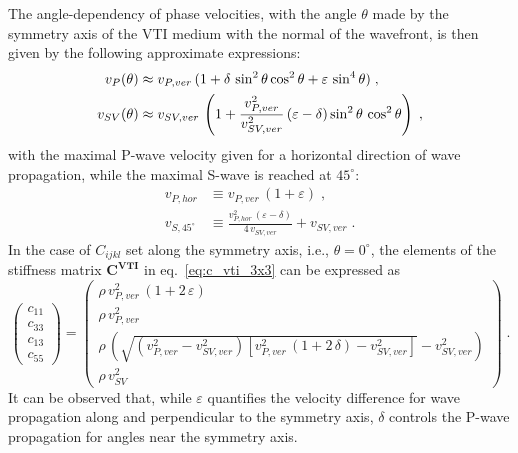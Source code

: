 The angle-dependency of phase velocities, with the angle $\theta$ made by the symmetry axis of the VTI medium with the normal of the wavefront, is then given by the following approximate expressions:
\begin{subequations}
\allowdisplaybreaks
\begin{align}
    v_P(\theta) &\approx v_{P,ver}\,(1+\delta\,\sin^2\theta\cos^2\theta+\varepsilon\,\sin^4\theta)\;,\\
    v_{SV}(\theta) &\approx v_{SV,ver}\,\left(1+\frac{v_{P,ver}^2}{v_{SV,ver}^2}\,(\varepsilon-\delta)\sin^2\theta\,\cos^2\theta\right)\;,
    \label{eq:vel_angle}
\end{align}
\end{subequations}
with the maximal P-wave velocity given for a horizontal direction of wave propagation, while the maximal S-wave is reached at $45^{\circ}$:
\begin{subequations}
    \begin{align}
    v_{P,hor} &\equiv v_{P,ver}\,(1+\varepsilon)\;,\\
    v_{S,45^{\circ}} &\equiv \frac{v_{P,hor}^2\,(\varepsilon-\delta)}{4\,v_{SV,ver}}+v_{SV,ver}\;.
    \end{align}
    \label{eq:v_aniso}
\end{subequations}%
In the case of $C_{ijkl}$ set along the symmetry axis, i.e., $\theta=0^{\circ}$, the elements of the stiffness matrix $\mathbf{C}^\mathbf{VTI}$ in eq.~\ref{eq:c_vti_3x3} can be expressed as
\begin{equation}
    \renewcommand{\arraystretch}{2}
    \begin{pmatrix}
    c_{11} \\
    c_{33} \\
    c_{13} \\
    c_{55}
    \end{pmatrix} = 
    \begin{pmatrix}
    \rho\,v_{P,ver}^2\,(1+2\,\varepsilon) \\
    \rho\,v_{P,ver}^2 \\
    \rho\,\left(\sqrt{\left(v_{P,ver}^2-v_{SV,ver}^2\right)\left[v_{P,ver}^2\,\left(1+2\,\delta\right)-v_{SV,ver}^2\right]}-v_{SV,ver}^2\right) \\
    \rho\,v_{SV}^2 
    \end{pmatrix}\;.
    \label{eq:c_vti_thomsen}
\end{equation}
It can be observed that, while $\varepsilon$ quantifies the velocity difference for wave propagation along and perpendicular to the symmetry axis, $\delta$ controls the P-wave propagation for angles near the symmetry axis. 

